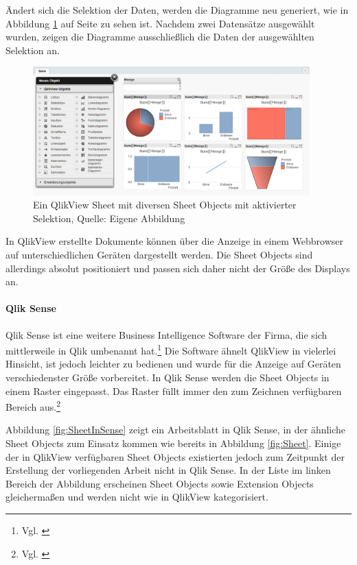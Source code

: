 Ändert sich die Selektion der Daten, werden die Diagramme neu generiert, wie in Abbildung \ref{fig:SheetWithSelection} auf Seite \pageref{fig:SheetWithSelection} zu sehen ist. Nachdem zwei Datensätze ausgewählt wurden, zeigen die Diagramme ausschließlich die Daten der ausgewählten Selektion an.


\ifIncludeFigures\begin{figure}[htbp]
	\centering
		\includegraphics[width=0.95\textwidth]{img/QlikView/SheetWithSelection.png}
	\caption[Ein QlikView Sheet mit diversen Sheet Objects mit aktivierter Selektion]{Ein QlikView Sheet mit diversen Sheet Objects mit aktivierter Selektion, Quelle: Eigene Abbildung}
	\label{fig:SheetWithSelection}
\end{figure}\fi

In QlikView erstellte Dokumente können über die Anzeige in einem Webbrowser auf unterschiedlichen Geräten dargestellt werden. Die Sheet Objects sind allerdings absolut positioniert und passen sich daher nicht der Größe des Displays an.

\newpage
\paragraph{Qlik Sense}
Qlik Sense ist eine weitere Business Intelligence Software der Firma, die sich mittlerweile in Qlik umbenannt hat.\footnote{Vgl. \cite{Qlik}} Die Software ähnelt QlikView in vielerlei Hinsicht, ist jedoch leichter zu bedienen und wurde für die Anzeige auf Geräten verschiedenster Größe vorbereitet. In Qlik Sense werden die Sheet Objects in einem Raster eingepasst. Das Raster füllt immer den zum Zeichnen verfügbaren Bereich aus.\footnote{Vgl. \cite[S. 11]{o2014qlik}}

Abbildung \ref{fig:SheetInSense} zeigt ein Arbeitsblatt in Qlik Sense, in der ähnliche Sheet Objects zum Einsatz kommen wie bereits in Abbildung \ref{fig:Sheet}. Einige der in QlikView verfügbaren Sheet Objects existierten jedoch zum Zeitpunkt der Erstellung der vorliegenden Arbeit nicht in Qlik Sense. In der Liste im linken Bereich der Abbildung erscheinen Sheet Objects sowie Extension Objects gleichermaßen und werden nicht wie in QlikView kategorisiert.


